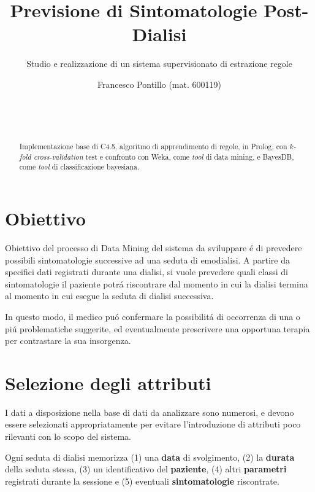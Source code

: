 \documentclass[preprint]{acm_proc_article-sp}
\begin{document}
\title{Previsione di Sintomatologie Post-Dialisi}
\subtitle{Studio e realizzazione di un sistema supervisionato di estrazione regole}

\author{
	\alignauthor
	Francesco Pontillo (mat. 600119)\\
       \\
       \\
       \\
}

\maketitle

\begin{abstract}
Implementazione base di C4.5, algoritmo di apprendimento di regole, in Prolog, con $k$\textit{-fold cross-validation} test e confronto con Weka, come \textit{tool} di data mining, e BayesDB, come \textit{tool} di classificazione bayesiana.
\end{abstract}

\section{Obiettivo}
Obiettivo del processo di Data Mining del sistema da sviluppare \'e di prevedere possibili sintomatologie successive ad una seduta di emodialisi.
A partire da specifici dati registrati durante una dialisi, si vuole prevedere quali classi di sintomatologie il paziente potr\'a riscontrare dal momento in cui la dialisi termina al momento in cui esegue la seduta di dialisi successiva.

In questo modo, il medico pu\'o confermare la possibilit\'a di occorrenza di una o pi\'u problematiche suggerite, ed eventualmente prescrivere una opportuna terapia per contrastare la sua insorgenza.

\section{Selezione degli attributi}
I dati a disposizione nella base di dati da analizzare sono numerosi, e devono essere selezionati appropriatamente per evitare l'introduzione di attributi poco rilevanti con lo scopo del sistema.

Ogni seduta di dialisi memorizza (1) una \textbf{data} di svolgimento, (2) la \textbf{durata} della seduta stessa, (3) un identificativo del \textbf{paziente}, (4) altri \textbf{parametri} registrati durante la sessione e (5) eventuali \textbf{sintomatologie} riscontrate.
\end{document}
